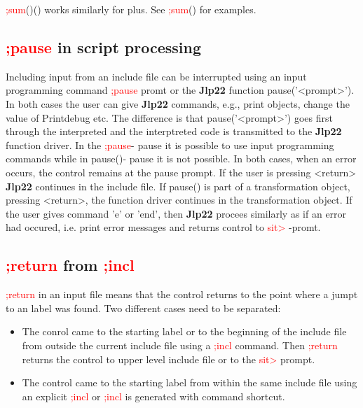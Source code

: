\begin{note} 
\textcolor{Red}{;sum}()() works similarly for plus. See \textcolor{Red}{;sum}() for examples. 
\end{note} 
\subsection{\textcolor{Red}{;pause} in script processing} 
\label{inpupause} 
Including input from an include file can be interrupted using an input programming 
command \textcolor{Red}{;pause} promt or the \textbf{Jlp22} function \textcolor{VioletRed}{pause}('<prompt>'). In both cases 
the user can give \textbf{Jlp22} commands, e.g., print objects, change the value of Printdebug etc. 
The difference is that  \textcolor{VioletRed}{pause}('<prompt>') goes first through the interpreted and the interptreted 
code is transmitted to the \textbf{Jlp22} function driver. In the \textcolor{Red}{;pause}- pause it is possible to 
use input programming commands while in \textcolor{VioletRed}{pause}()- pause it is not possible. In both cases, when 
an error occurs, the control remains at the pause prompt. If the user is pressing 
<return> \textbf{Jlp22} continues in the include file. If \textcolor{VioletRed}{pause}() is part of a transformation object, 
pressing <return>, the function driver continues in the transformation object. 
If the user gives command 'e' or 'end', then \textbf{Jlp22} procees similarly as if an error had occured, 
i.e. print error messages and returns control to \textcolor{Red}{sit>} -promt. 
\subsection{\textcolor{Red}{;return} from \textcolor{Red}{;incl}} 
\label{inpureturn} 
\textcolor{Red}{;return} in an input file means that the control returns to the point where a 
jumpt to an label was found. Two different cases need to be separated: 
\begin{itemize} 
\item The conrol came to the starting label or to the beginning of the include file 
from outside the current include file using a \textcolor{Red}{;incl} command. Then \textcolor{Red}{;return} returns the control to upper level include 
file or to the \textcolor{Red}{sit>} prompt. 
\item The control came to the starting label from within the same include file using 
an explicit \textcolor{Red}{;incl} or \textcolor{Red}{;incl} is generated 
with command shortcut. 
\end{itemize} 
